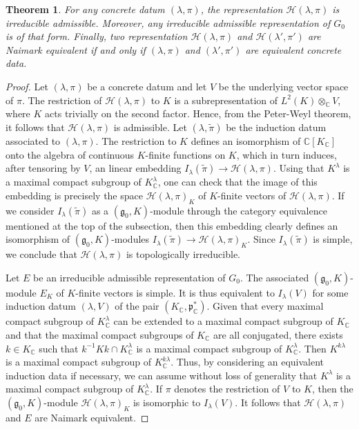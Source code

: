 \documentclass{amsart}
\newtheorem{theorem}{Theorem}
\theoremstyle{definition}
\begin{document}
\begin{theorem}\label{motiongroup}
For any concrete datum $(\lambda,\pi)$, the representation $\mathcal{H}(\lambda,\pi)$ is irreducible admissible. Moreover, any irreducible admissible representation of $G_0$ is of that form. Finally, two representation $\mathcal{H}(\lambda,\pi)$ and $\mathcal{H}(\lambda',\pi')$ are Naimark equivalent if and only if $(\lambda,\pi)$ and $(\lambda',\pi')$ are equivalent concrete data.
\end{theorem}

\begin{proof} 
    Let $(\lambda,\pi)$ be a concrete datum and let $V$ be the underlying vector space of $\pi$. The restriction of $\mathcal{H}(\lambda,\pi)$ to $K$ is a subrepresentation of $L^2(K) \otimes_\mathbb{C} V$, where $K$ acts trivially on the second factor. Hence, from the Peter-Weyl theorem, it follows that $\mathcal{H}(\lambda,\pi)$ is admissible. Let $(\lambda,\tilde\pi)$ be the induction datum associated to $(\lambda,\pi)$. The restriction to $K$ defines an isomorphism of $\mathbb{C}[K_\mathbb{C}]$ onto the algebra of continuous $K$-finite functions on $K$, which in turn induces, after tensoring by $V$, an linear embedding $I_\lambda(\tilde \pi) \to \mathcal{H}(\lambda,\pi)$. Using that $K^\lambda$ is a maximal compact subgroup of $K_\mathbb{C}^\lambda$, one can check that the image of this embedding is precisely the space $\mathcal{H}(\lambda,\pi)_K$ of $K$-finite vectors of $\mathcal{H}(\lambda,\pi)$. If we consider $I_\lambda(\tilde \pi)$ as a $(\mathfrak{g}_0,K)$-module through the category equivalence mentioned at the top of the subsection, then this embedding clearly defines an isomorphism of $(\mathfrak{g}_0,K)$-modules $I_\lambda(\tilde \pi) \to \mathcal{H}(\lambda,\pi)_K$. Since $I_\lambda(\tilde \pi)$ is simple, we conclude that $\mathcal{H}(\lambda,\pi)$ is topologically irreducible.
    
    Let $E$ be an irreducible admissible representation of $G_0$. The associated $(\mathfrak{g}_0,K)$-module $E_K$ of $K$-finite vectors is simple. It is thus equivalent to $I_\lambda(V)$ for some induction datum $(\lambda, V)$ of the pair $(K_\mathbb{C}, \mathfrak{p}^*_\mathbb{C})$. Given that every maximal compact subgroup of $K^\lambda_\mathbb{C}$ can be extended to a maximal compact subgroup of $K_\mathbb{C}$ and that the maximal compact subgroups of $K_\mathbb{C}$ are all conjugated, there exists $k \in K_\mathbb{C}$ such that $k^{-1} K k \cap K_\mathbb{C}^\lambda$ is a maximal compact subgroup of $K^\lambda_\mathbb{C}$. Then $K^{k\lambda}$ is a maximal compact subgroup of $K^{k\lambda}_\mathbb{C}$. Thus, by considering an equivalent induction data if necessary, we can assume without loss of generality that $K^\lambda$ is a maximal compact subgroup of $K_\mathbb{C}^\lambda$. If $\pi$ denotes the restriction of $V$ to $K$, then the $(\mathfrak{g}_0, K)$-module $\mathcal{H}(\lambda,\pi)_K$ is isomorphic to $I_\lambda(V)$. It follows that $\mathcal{H}(\lambda,\pi)$ and $E$ are Naimark equivalent.
    

\end{proof}
\end{document}
